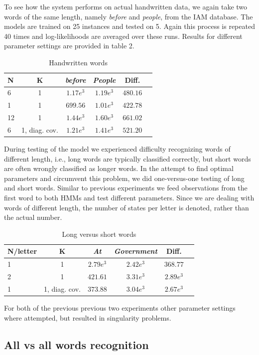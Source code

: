 \documentclass[conference]{IEEEtran}
\begin{document}
To see how the system performs on actual handwritten data, we again take two words of the same length, namely {\it before} and {\it people}, from the IAM database. The models are trained on 25 instances and tested on 5. Again this process is repeated 40 times and log-likelihoods are averaged over these runs. Results for different parameter settings are provided in table 2.
\begin{table}[H]
\centering
\caption{Handwritten words}
 \begin{tabular}{|l|c|c|c|c|r|}\hline
  N 	& K 		& {\it before} 		& {\it People} 	& 	Diff. 		\\\hline
  6 	& 1 		&  $1.17e^3$ 		& $1.19e^3$ 	& 	$480.16$	\\
  1 	& 1 		&  $699.56$ 		& $1.01e^3$ 	&	$422.78$	\\
  12	& 1		&  $1.44e^3$		& $1.60e^3$ 	&	$661.02$	\\
  6	& 1, diag. cov. & $1.21e^3$		& $1.41e^{3}$	&	$521.20$	\\\hline
 \end{tabular}
\end{table}
During testing of the model we experienced difficulty recognizing words of different length, i.e., long words are typically classified correctly, but short words are often wrongly classified as longer words. In the attempt to find optimal parameters and circumvent this problem, we did one-versus-one testing of long and short words. Similar to previous experiments we feed observations from the first word to both HMMs and test different parameters. Since we are dealing with words of different length, the number of states per letter is denoted, rather than the actual number.
\begin{table}[H]
\centering
\caption{Long versus short words}
 \begin{tabular}{|l|c|c|c|c|r|}\hline
  N/letter 	& K 			& {\it At} 	& {\it Government} 	& Diff. 	\\\hline
  1		& 1			& $2.79e^3$	&  $2.42e^3$ 		& $368.77$	\\
  2		& 1			& $421.61$	& $3.31e^{3}$		& $2.89e^{3}$	\\
  1		& 1, diag. cov.		& $373.88$	& $3.04e^3$		& $2.67e^{3}$	\\\hline
 \end{tabular}
\end{table}
For both of the previous previous two experiments other parameter settings where attempted, but resulted in singularity problems.

\subsection{All vs all words recognition} \label{SubS:ALLvsALL}
\end{document}
